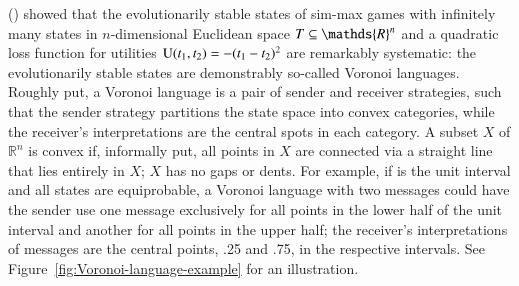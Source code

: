 \documentclass[11pt,english]{article}
\numberwithin{equation}{section}
\newcommand{\citetbjps}[1]{\citeauthor{#1} (\citeyear{#1})}
\begin{document}
\citetbjps{JagerMetzger2011:Voronoi-Languag} showed that the evolutionarily stable states of sim-max games with infinitely many states in $n$-dimensional Euclidean space $\States \subseteq \mathds{R}^n$ and a quadratic loss function for utilities $\mathrm{U}(t_{\mathrm{1}}, t_{\mathrm{2}}) = - (t_{\mathrm{1}} - t_{\mathrm{2}})^2$ are remarkably systematic: the evolutionarily stable states are demonstrably so-called Voronoi languages.
Roughly put, a Voronoi
language is a pair of sender and receiver strategies, such that the sender strategy partitions
the state space into convex categories, while the receiver's interpretations are the central
spots in each category. A subset $X$ of $\mathds{R}^n$ is convex if, informally put, all points
in $X$ are connected via a straight line that lies entirely in $X$; $X$ has no gaps or
dents. For example, if \States is the unit interval and all states are equiprobable, a Voronoi
language with two messages could have the sender use one message exclusively for all points in
the lower half of the unit interval and another for all points in the upper half; the
receiver's interpretations of messages are the central points, .25 and .75, in the respective
intervals.  See Figure~\ref{fig:Voronoi-language-example} for an illustration.
\end{document}
